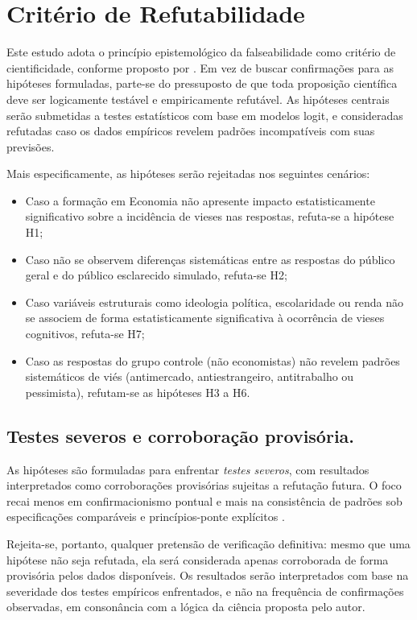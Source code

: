 \section{Critério de Refutabilidade}

Este estudo adota o princípio epistemológico da falseabilidade como critério de cientificidade, conforme proposto por . Em vez de buscar confirmações para as hipóteses formuladas, parte-se do pressuposto de que toda proposição científica deve ser logicamente testável e empiricamente refutável. As hipóteses centrais serão submetidas a testes estatísticos com base em modelos logit, e consideradas refutadas caso os dados empíricos revelem padrões incompatíveis com suas previsões.

Mais especificamente, as hipóteses serão rejeitadas nos seguintes cenários:

\begin{itemize}
    \item Caso a formação em Economia não apresente impacto estatisticamente significativo sobre a incidência de vieses nas respostas, refuta-se a hipótese H1;
    \item Caso não se observem diferenças sistemáticas entre as respostas do público geral e do público esclarecido simulado, refuta-se H2;
    \item Caso variáveis estruturais como ideologia política, escolaridade ou renda não se associem de forma estatisticamente significativa à ocorrência de vieses cognitivos, refuta-se H7;
    \item Caso as respostas do grupo controle (não economistas) não revelem padrões sistemáticos de viés (antimercado, antiestrangeiro, antitrabalho ou pessimista), refutam-se as hipóteses H3 a H6.
\end{itemize}

\subsection{Testes severos e corroboração provisória.}
As hipóteses são formuladas para enfrentar \textit{testes severos}, com resultados interpretados como corroborações provisórias sujeitas a refutação futura. O foco recai menos em confirmacionismo pontual e mais na consistência de padrões sob especificações comparáveis e princípios-ponte explícitos \cite{hausman2008,stigum2003}.

Rejeita-se, portanto, qualquer pretensão de verificação definitiva: mesmo que uma hipótese não seja refutada, ela será considerada apenas corroborada de forma provisória pelos dados disponíveis. Os resultados serão interpretados com base na severidade dos testes empíricos enfrentados, e não na frequência de confirmações observadas, em consonância com a lógica da ciência proposta pelo autor.

